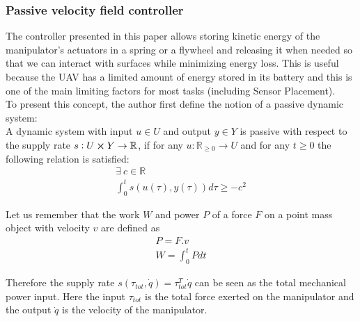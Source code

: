 \subsubsection{Passive velocity field controller}
The controller presented in this paper allows storing kinetic energy of the manipulator's actuators in a spring or a flywheel and releasing it when needed so that we can interact with surfaces while minimizing energy loss. This is useful because the UAV has a limited amount of energy stored in its battery and this is one of the main limiting factors for most tasks (including Sensor Placement). \\
To present this concept, the author first define the notion of a passive dynamic system:\\
A dynamic system with input $u \in U$ and output $y \in Y$ is passive with respect to the supply rate 
$s:U \cross Y \rightarrow \mathbb R$, if for any $u: \mathbb R_{\ge 0} \rightarrow U $ and for any $t\geq 0$ the following relation is satisfied:
\begin{align}
    \exists ~ c\in\mathbb R  \nonumber\\
    \int_{0}^{t}s(u(\tau),y(\tau))d\tau \geq -c^2
\end{align}

Let us remember that the work $W$ and power $P$ of a force $F$ on a point mass object with velocity $v$ are defined as
\begin{align}
    P = F.v\\
    W = \int_{0}^{t}P dt
\end{align}

Therefore the supply rate  $s(\tau_{tot},\dot{q})=\tau_{tot}^{T}\dot{q}$ can be seen as the total mechanical power input. Here the input $\tau_{tot}$ is the total force exerted on the manipulator 
and the output $\dot{q}$ is the velocity of the manipulator. 

